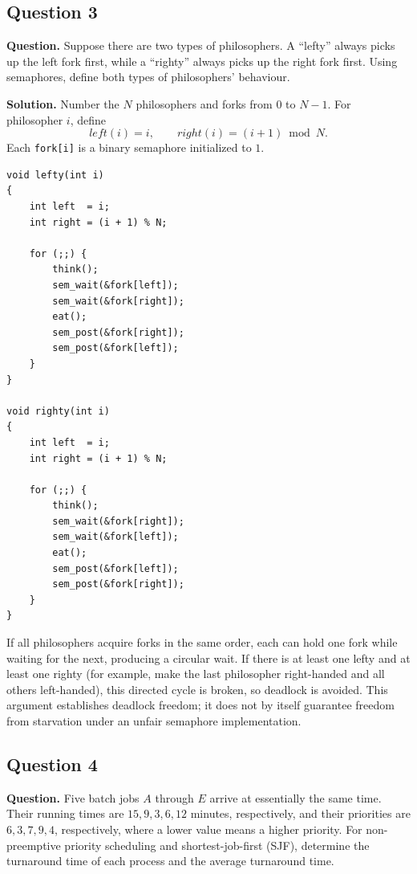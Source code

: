 \subsection*{Question 3}
\textbf{Question.}
Suppose there are two types of philosophers.  A ``lefty'' always picks
up the left fork first, while a ``righty'' always picks up the right
fork first.  Using semaphores, define both types of philosophers'
behaviour.

\textbf{Solution.}
Number the \(N\) philosophers and forks from \(0\) to \(N-1\).  For
philosopher \(i\), define
\[
  \mathit{left}(i)=i,\qquad
  \mathit{right}(i)=(i+1)\bmod N.
\]
Each \texttt{fork[i]} is a binary semaphore initialized to \(1\).

\begin{verbatim}
void lefty(int i)
{
    int left  = i;
    int right = (i + 1) % N;

    for (;;) {
        think();
        sem_wait(&fork[left]);
        sem_wait(&fork[right]);
        eat();
        sem_post(&fork[right]);
        sem_post(&fork[left]);
    }
}

void righty(int i)
{
    int left  = i;
    int right = (i + 1) % N;

    for (;;) {
        think();
        sem_wait(&fork[right]);
        sem_wait(&fork[left]);
        eat();
        sem_post(&fork[left]);
        sem_post(&fork[right]);
    }
}
\end{verbatim}

If all philosophers acquire forks in the same order, each can hold one
fork while waiting for the next, producing a circular wait.  If there
is at least one lefty and at least one righty (for example, make the
last philosopher right-handed and all others left-handed), this
directed cycle is broken, so deadlock is avoided.  This argument
establishes deadlock freedom; it does not by itself guarantee freedom
from starvation under an unfair semaphore implementation.

\subsection*{Question 4}
\textbf{Question.}
Five batch jobs \(A\) through \(E\) arrive at essentially the same time.
Their running times are \(15,9,3,6,12\) minutes, respectively, and
their priorities are \(6,3,7,9,4\), respectively, where a lower value
means a higher priority.  For non-preemptive priority scheduling and
shortest-job-first (SJF), determine the turnaround time of each process
and the average turnaround time.


